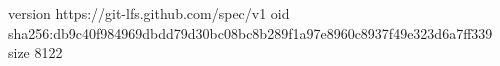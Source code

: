 version https://git-lfs.github.com/spec/v1
oid sha256:db9c40f984969dbdd79d30bc08bc8b289f1a97e8960c8937f49e323d6a7ff339
size 8122

